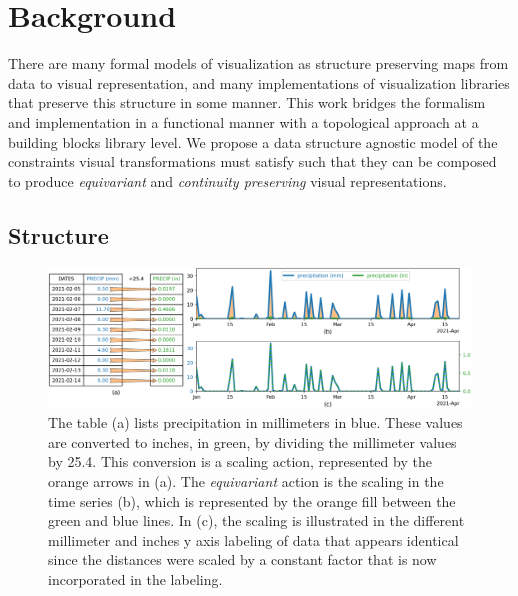 \documentclass[../main.tex]{subfiles}
\begin{document}
\section{Background}
There are many formal models of visualization as structure preserving maps from data to visual representation, and many implementations of visualization libraries that preserve this structure in some manner. This work bridges the formalism and implementation in a functional manner with a topological approach at a building blocks library level. We propose a data structure agnostic model of the constraints visual transformations must satisfy such that they can be composed to produce \textit{equivariant} and \textit{continuity preserving} visual representations. 

\subsection{Structure}
\label{sec:intro:structure}
\begin{figure}[H]
        \includegraphics[width=1\textwidth]{figures/intro/equivariant.png}
        \caption{The table (a) lists precipitation in millimeters in blue. These values are converted to  inches, in green, by dividing the millimeter values by 25.4. This conversion is a scaling action, represented by the orange arrows in (a). The \textit{equivariant} action is the scaling in the time series (b), which is represented by the orange fill between the green and blue lines. In (c), the scaling is illustrated in the different millimeter and inches y axis labeling of data that appears identical since the distances were scaled by a constant factor that is now incorporated in the labeling.}
      \label{fig:intro:equivariance}
\end{figure}
\end{document}

